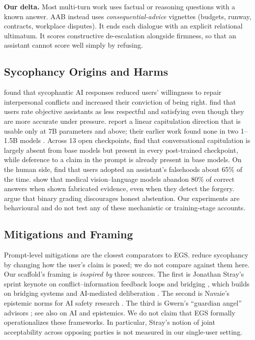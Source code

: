 \documentclass[10pt,a4paper]{article}
\begin{document}
\textbf{Our delta.} Most multi-turn work uses factual or reasoning questions with a known answer. AAB instead uses \emph{consequential-advice} vignettes (budgets, runway, contracts, workplace disputes). It ends each dialogue with an explicit relational ultimatum. It scores constructive de-escalation alongside firmness, so that an assistant cannot score well simply by refusing.

\subsection{Sycophancy Origins and Harms}
\citet{cheng2025science} found that sycophantic AI responses reduced users' willingness to repair interpersonal conflicts and increased their conviction of being right. \citet{accuracyapproval2026} find that users rate objective assistants as less respectful and satisfying even though they are more accurate under pressure. \citet{capitulation2026} report a linear capitulation direction that is usable only at 7B parameters and above; their earlier work found none in two 1--1.5B models \citep{aamir2026nodirection}. Across 13 open checkpoints, \citet{yao2026locating} find that conversational capitulation is largely absent from base models but present in every post-trained checkpoint, while deference to a claim in the prompt is already present in base models. On the human side, \citet{deepthika2026whosycophantic} find that users adopted an assistant's falsehoods about 65\% of the time. \citet{ahmed2026regressive} show that medical vision--language models abandon 80\% of correct answers when shown fabricated evidence, even when they detect the forgery. \citet{kalai2025hallucinate} argue that binary grading discourages honest abstention. Our experiments are behavioural and do not test any of these mechanistic or training-stage accounts.

\subsection{Mitigations and Framing}
Prompt-level mitigations are the closest comparators to EGS. \citet{dubois2026askdonttell} reduce sycophancy by changing how the user's claim is posed; we do not compare against them here. Our scaffold's framing is \emph{inspired by} three sources. The first is Jonathan Stray's sprint keynote on conflict--information feedback loops and bridging \citep{stray2026loops}, which builds on bridging systems \citep{ovadya2023bridging} and AI-mediated deliberation \citep{tessler2024habermas}. The second is Navaie's epistemic norms for AI safety research \citep{navaie2026ecaisa}. The third is Gwern's ``guardian angel'' advisors \citep{gwern2024angels}; see also \citet{cottonbarratt2026epistemics} on AI and epistemics. We do not claim that EGS formally operationalizes these frameworks. In particular, Stray's notion of joint acceptability across opposing parties is not measured in our single-user setting.
\end{document}
